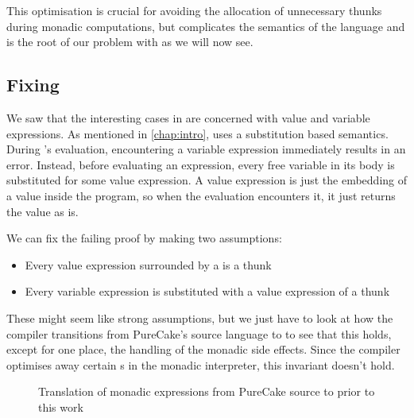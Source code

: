This optimisation is crucial for avoiding the allocation of unnecessary thunks
during monadic computations, but complicates the semantics of the language and
is the root of our problem with  as we will now see.

\subsection {Fixing }

We saw that the interesting cases in  are concerned with value
and variable expressions. As mentioned in \autoref{chap:intro}, \ThunkLang{}
uses a substitution based semantics. During \ThunkLang{}'s evaluation,
encountering a variable expression immediately results in an error. Instead,
before evaluating an expression, every free variable in its body is substituted
for some value expression. A value expression is just the embedding of a value
inside the program, so when the evaluation encounters it, it just returns the
value as is.

We can fix the failing proof by making two assumptions:
\begin{itemize}
\item Every value expression surrounded by a  is a thunk
\item Every variable expression is substituted with a value expression of a
  thunk
\end{itemize}
These might seem like strong assumptions, but we just have to look at how the
compiler transitions from PureCake's source language to \ThunkLang{} to see that
this holds, except for one place, the handling of the monadic side effects.
Since the compiler optimises away certain s in the monadic
interpreter, this invariant doesn't hold.

\begin{figure}[h]
  \caption{Translation of monadic expressions from PureCake source to
           \ThunkLang{} prior to this work}
\end{figure}

